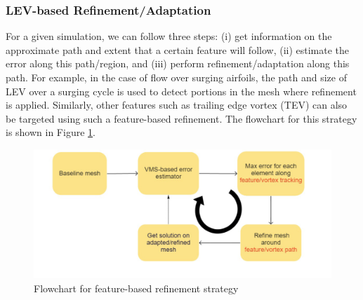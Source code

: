 \subsubsection{LEV-based Refinement/Adaptation}

For a given simulation, we can follow three steps: (i) get information on the approximate path and extent that a certain feature will follow, (ii) estimate the error along this path/region, and (iii) perform refinement/adaptation along this path.
For example, in the case of flow over surging airfoils, the path and size of LEV over a surging cycle is used to detect portions in the mesh where refinement is applied.
Similarly, other features such as trailing edge vortex (TEV) can also be targeted using such a feature-based refinement. The flowchart for this strategy is shown in Figure \ref{fig:feature_based_strat}.

\begin{figure}[H]
	\centering
	\includegraphics[width=1\textwidth]{figures/adapt_strat/feature_based.png}
	\caption{Flowchart for feature-based refinement strategy}
	\label{fig:feature_based_strat}
\end{figure}


